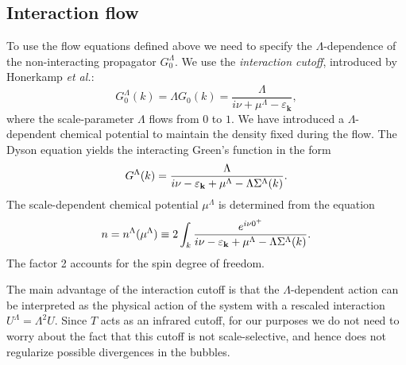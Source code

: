 \subsection{Interaction flow}
\label{sec:IntFlow}
To use the flow equations defined above we need to specify the $\Lambda$-dependence of the non-interacting propagator $G_0^\Lambda$.
We use the \textit{interaction cutoff}, introduced by Honerkamp {\em et al.}: \cite{Honerkamp2004}
 \begin{equation}
 G_0^\Lambda(k) = \Lambda G_0(k) =
 \frac{\Lambda}{i\nu + \mu^\Lambda - \varepsilon_{\mathbf{k}}} , 
 \end{equation}
where the scale-parameter $\Lambda$ flows from $0$ to $1$. 
We have introduced a $\Lambda$-dependent chemical potential to maintain the density fixed during the flow.
The Dyson equation yields the interacting Green's function in the form
\begin{equation}
 G^\Lambda (k) = \frac{\Lambda}{i\nu - \varepsilon_{\mathbf{k}}
 + \mu^{\Lambda} - \Lambda\Sigma^\Lambda(k)} . 
\end{equation}
The scale-dependent chemical potential $\mu^\Lambda$ is determined from the equation
\begin{equation}
n = n^{\Lambda}(\mu^\Lambda) \equiv 2 \int_k \frac{e^{i\nu 0^{+}}} {i\nu - \varepsilon_{\mathbf{k}} +\mu^{\Lambda}-\Lambda\Sigma^\Lambda(k)}. 
\end{equation} 
The factor 2 accounts for the spin degree of freedom.

The main advantage of the interaction cutoff is that  the $\Lambda$-dependent action can be interpreted \cite{Honerkamp2004} as the physical action of the system with a rescaled interaction $U^\Lambda = \Lambda^2 U$.
Since $T$ acts as an infrared cutoff, for our purposes we do not need to worry about the fact that this cutoff is not scale-selective, and hence does not regularize possible divergences in the bubbles. 



 


